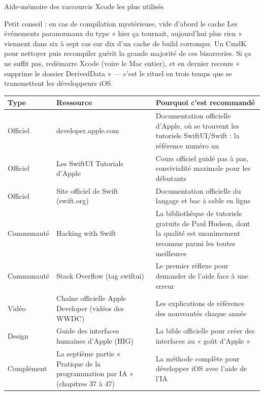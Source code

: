 \begin{center}\small\color{gray}Aide-mémoire des raccourcis Xcode les plus utilisés\end{center}

\begin{tcbinfo}{Petit conseil : en cas de compilation mystérieuse, vide d'abord le cache}
Les événements paranormaux du type « hier ça tournait, aujourd'hui plus rien » viennent dans six à sept cas sur dix d'un cache de build corrompu. Un CmdK pour nettoyer puis recompiler guérit la grande majorité de ces bizarreries. Si ça ne suffit pas, redémarre Xcode (voire le Mac entier), et en dernier recours « supprime le dossier DerivedData » — c'est le rituel en trois temps que se transmettent les développeurs iOS.

\end{tcbinfo}



\begin{center}
\begin{tabularx}{\linewidth}{|X|X|X|}
\hline
\textbf{Type} & \textbf{Ressource} & \textbf{Pourquoi c'est recommandé} \tabularnewline
\hline
Officiel & developer.apple.com & Documentation officielle d'Apple, où se trouvent les tutoriels SwiftUI/Swift : la référence numéro un \tabularnewline
Officiel & Les SwiftUI Tutorials d'Apple & Cours officiel guidé pas à pas, convivialité maximale pour les débutants \tabularnewline
Officiel & Site officiel de Swift (swift.org) & Documentation officielle du langage et bac à sable en ligne \tabularnewline
Communauté & Hacking with Swift & La bibliothèque de tutoriels gratuits de Paul Hudson, dont la qualité est unanimement reconnue parmi les toutes meilleures \tabularnewline
Communauté & Stack Overflow (tag swiftui) & Le premier réflexe pour demander de l'aide face à une erreur \tabularnewline
Vidéo & Chaîne officielle Apple Developer (vidéos des WWDC) & Les explications de référence des nouveautés chaque année \tabularnewline
Design & Guide des interfaces humaines d'Apple (HIG) & La bible officielle pour créer des interfaces au « goût d'Apple » \tabularnewline
Complément & La septième partie « Pratique de la programmation par IA » (chapitres 37 à 47) & La méthode complète pour développer iOS avec l'aide de l'IA \tabularnewline
\hline
\end{tabularx}
\end{center}

